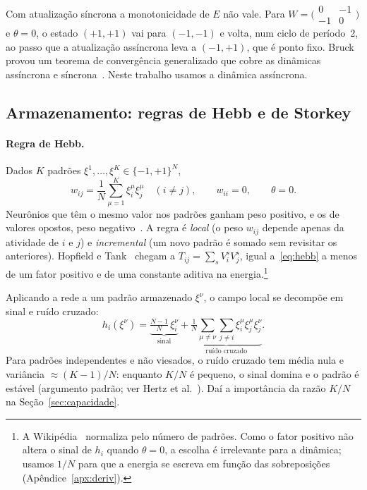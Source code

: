 \begin{observacao}
Com atualização síncrona a monotonicidade de $E$ não vale. Para $W=\bigl(\begin{smallmatrix}0&-1\\-1&0\end{smallmatrix}\bigr)$
e $\theta=0$, o estado $(+1,+1)$ vai para $(-1,-1)$ e volta, num ciclo de período~2, ao passo que a
atualização assíncrona leva a $(-1,+1)$, que é ponto fixo. Bruck~\cite{bruck1990} provou um teorema de
convergência generalizado que cobre as dinâmicas assíncrona e síncrona~\cite{wikihopfield}. Neste trabalho
usamos a dinâmica assíncrona.
\end{observacao}

\subsection{Armazenamento: regras de Hebb e de Storkey}\label{sec:regras}
\paragraph{Regra de Hebb.} Dados $K$ padrões $\xi^1,\dots,\xi^K\in\{-1,+1\}^N$,
\begin{equation}\label{eq:hebb}
w_{ij}=\frac1N\sum_{\mu=1}^{K}\xi_i^{\mu}\xi_j^{\mu}\quad(i\neq j),\qquad w_{ii}=0,\qquad\theta=0 .
\end{equation}
Neurônios que têm o mesmo valor nos padrões ganham peso positivo, e os de valores opostos, peso
negativo~\cite{wikihopfield}. A regra é \emph{local} (o peso $w_{ij}$ depende apenas da atividade de $i$ e
$j$) e \emph{incremental} (um novo padrão é somado sem revisitar os anteriores). Hopfield e
Tank~\cite[p.~145]{hopfieldtank1985} chegam a $T_{ij}=\sum_sV_i^sV_j^s$, igual a~\eqref{eq:hebb} a menos
de um fator positivo e de uma constante aditiva na energia.\footnote{A Wikipédia~\cite{wikihopfield}
normaliza pelo número de padrões. Como o fator positivo não altera o sinal de $h_i$ quando $\theta=0$, a
escolha é irrelevante para a dinâmica; usamos $1/N$ para que a energia se escreva em função das
sobreposições (Apêndice~\ref{apx:deriv}).}

Aplicando a rede a um padrão armazenado $\xi^\nu$, o campo local se decompõe em sinal e ruído cruzado:
\[
h_i(\xi^\nu)=\underbrace{\tfrac{N-1}{N}\,\xi_i^\nu}_{\text{sinal}}+\underbrace{\tfrac1N\sum_{\mu\neq\nu}\sum_{j\neq i}\xi_i^\mu\xi_j^\mu\xi_j^\nu}_{\text{ruído cruzado}} .
\]
Para padrões independentes e não viesados, o ruído cruzado tem média nula e variância ${\approx}(K-1)/N$:
enquanto $K/N$ é pequeno, o sinal domina e o padrão é estável (argumento padrão; ver
Hertz et al.~\cite{hertz1991}). Daí a importância da razão $K/N$ na Seção~\ref{sec:capacidade}.

